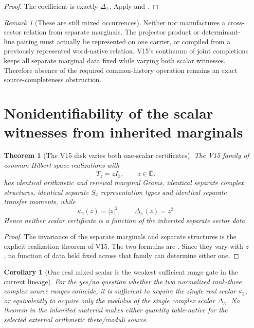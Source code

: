\documentclass[11pt]{article}
\newtheorem{theorem}{Theorem}[section]
\newtheorem{corollary}[corollary]{Corollary}
\theoremstyle{definition}
\theoremstyle{remark}
\newtheorem{remark}[remark]{Remark}
\begin{document}
\begin{proof}
The coefficient is exactly $\Delta_\wedge$.  Apply
 and .
\end{proof}

\begin{remark}[These are still mixed occurrences]
\label{fire:v16-mixed-still-needed}
Neither  nor
 manufactures a cross-sector relation from separate
marginals.  The projector product or determinant-line pairing must actually be
represented on one carrier, or compiled from a previously represented
word-native relation.  V15's continuum of joint completions keeps all separate
marginal data fixed while varying both scalar witnesses.  Therefore absence of
the required common-history operation remains an exact source-completeness
obstruction.
\end{remark}

\section{Nonidentifiability of the scalar witnesses from inherited marginals}
\label{sec:v16-nonident}

\begin{theorem}[The V15 disk varies both one-scalar certificates]
\label{thm:v16-scalar-nonident}
The V15 family of common-Hilbert-space realizations with
\[
 T_z=zI_3,
 \qquad z\in\overline{\mathbb D},
\]
has identical arithmetic and renewal marginal Grams, identical separate
complex structures, identical separate $S_4$ representation types and
identical separate transfer moments, while
\[
 \boxed{
 \kappa_2(z)=|z|^2,
 \qquad
 \Delta_\wedge(z)=z^3.}
 \tag{V16.10}
\]
Hence neither scalar certificate is a function of the inherited separate
sector data.
\end{theorem}

\begin{proof}
The invariance of the separate marginals and separate structures is the
explicit realization theorem of V15.  The two formulas are
.  Since they vary with $z$, no
function of data held fixed across that family can determine either one.
\end{proof}

\begin{corollary}[One real mixed scalar is the weakest sufficient range gate in the current lineage]
\label{cor:v16-one-scalar-gate}
For the yes/no question whether the two normalized rank-three complex source
ranges coincide, it is sufficient to acquire the single real scalar
$\kappa_2$, or equivalently to acquire only the modulus of the single complex
scalar $\Delta_\wedge$.  No theorem in the inherited material makes either
quantity table-native for the selected external arithmetic theta/moduli
source.
\end{corollary}
\end{document}
